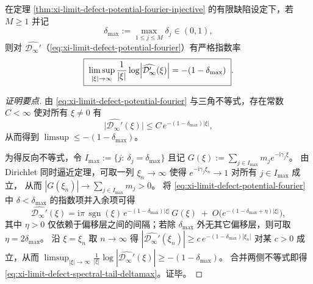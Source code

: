 \begin{corollary}[谱尾指数读取最大离线偏移]\label{cor:xi-limit-defect-potential-spectral-tail-reads-deltamax}
在定理 \ref{thm:xi-limit-defect-potential-fourier-injective} 的有限缺陷设定下，若 \(M\ge 1\) 并记
\[
\delta_{\max}:=\max_{1\le j\le M}\delta_j\in(0,1),
\]
则对 \(\widehat{\mathcal{D}_\infty'}\)（\eqref{eq:xi-limit-defect-potential-fourier}）有严格指数率
\begin{equation}\label{eq:xi-limit-defect-spectral-tail-deltamax}
\boxed{\;
\limsup_{|\xi|\to\infty}\frac{1}{|\xi|}\log\Bigl|\widehat{\mathcal{D}_\infty'}(\xi)\Bigr|
=-(1-\delta_{\max})\; } .
\end{equation}
\end{corollary}
\begin{proof}[证明要点]
由 \eqref{eq:xi-limit-defect-potential-fourier} 与三角不等式，存在常数 \(C<\infty\) 使对所有 \(\xi\neq 0\) 有
\[
\bigl|\widehat{\mathcal{D}_\infty'}(\xi)\bigr|
\le C\,e^{-(1-\delta_{\max})|\xi|},
\]
从而得到 \(\limsup\le -(1-\delta_{\max})\)。
\par
为得反向不等式，令 \(I_{\max}:=\{j:\ \delta_j=\delta_{\max}\}\) 且记
\(
G(\xi):=\sum_{j\in I_{\max}} m_j e^{-\mathrm{i}\gamma_j\xi}
\)。
由 Dirichlet 同时逼近定理，可取一列 \(\xi_n\to\infty\) 使得 \(e^{-\mathrm{i}\gamma_j\xi_n}\to 1\) 对所有 \(j\in I_{\max}\) 成立，
从而 \(|G(\xi_n)|\to \sum_{j\in I_{\max}}m_j>0\)。
将 \eqref{eq:xi-limit-defect-potential-fourier} 中 \(\delta<\delta_{\max}\) 的指数项并入余项可得
\[
\widehat{\mathcal{D}_\infty'}(\xi)
=\mathrm{i}\pi\,\operatorname{sgn}(\xi)\,e^{-(1-\delta_{\max})|\xi|}\,G(\xi)
\;+\;O\!\bigl(e^{-(1-\delta_{\max}+\eta)|\xi|}\bigr),
\]
其中 \(\eta>0\) 仅依赖于偏移层之间的间隔；若除 \(\delta_{\max}\) 外无其它偏移层，则可取 \(\eta=2\delta_{\max}\)。
沿 \(\xi=\xi_n\) 取 \(n\to\infty\) 得
\(
|\widehat{\mathcal{D}_\infty'}(\xi_n)|\ge c\,e^{-(1-\delta_{\max})|\xi_n|}
\)
对某 \(c>0\) 成立，从而
\(
\limsup_{|\xi|\to\infty}\frac{1}{|\xi|}\log|\widehat{\mathcal{D}_\infty'}(\xi)|
\ge -(1-\delta_{\max})
\)。
合并两侧不等式即得 \eqref{eq:xi-limit-defect-spectral-tail-deltamax}。证毕。
\end{proof}

